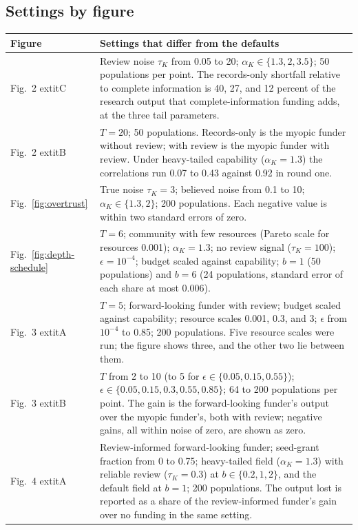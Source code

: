 \subsection*{Settings by figure}
\begin{table}[h]
\centering
\small
\begin{tabular}{@{}p{2.1cm}p{10.2cm}@{}}
\toprule
Figure & Settings that differ from the defaults \\
\midrule
Fig.~2	extit{C} & Review noise $\tau_K$ from 0.05 to 20; $\alpha_K \in \{1.3, 2, 3.5\}$; 50 populations per point. The records-only shortfall relative to complete information is 40, 27, and 12 percent of the research output that complete-information funding adds, at the three tail parameters. \\
Fig.~2	extit{B} & $T = 20$; 50 populations. Records-only is the myopic funder without review; with review is the myopic funder with review. Under heavy-tailed capability ($\alpha_K = 1.3$) the correlations run 0.07 to 0.43 against 0.92 in round one. \\
Fig.~\ref{fig:overtrust} & True noise $\tau_K = 3$; believed noise from 0.1 to 10; $\alpha_K \in \{1.3, 2\}$; 200 populations. Each negative value is within two standard errors of zero. \\
Fig.~\ref{fig:depth-schedule} & $T = 6$; community with few resources (Pareto scale for resources 0.001); $\alpha_K = 1.3$; no review signal ($\tau_K = 100$); $\epsilon = 10^{-4}$; budget scaled against capability; $b = 1$ (50 populations) and $b = 6$ (24 populations, standard error of each share at most 0.006). \\
Fig.~3	extit{A} & $T = 5$; forward-looking funder with review; budget scaled against capability; resource scales 0.001, 0.3, and 3; $\epsilon$ from $10^{-4}$ to 0.85; 200 populations. Five resource scales were run; the figure shows three, and the other two lie between them. \\
Fig.~3	extit{B} & $T$ from 2 to 10 (to 5 for $\epsilon \in \{0.05, 0.15, 0.55\}$); $\epsilon \in \{0.05, 0.15, 0.3, 0.55, 0.85\}$; 64 to 200 populations per point. The gain is the forward-looking funder's output over the myopic funder's, both with review; negative gains, all within noise of zero, are shown as zero. \\
Fig.~4	extit{A} & Review-informed forward-looking funder; seed-grant fraction from 0 to 0.75; heavy-tailed field ($\alpha_K = 1.3$) with reliable review ($\tau_K = 0.3$) at $b \in \{0.2, 1, 2\}$, and the default field at $b = 1$; 200 populations. The output lost is reported as a share of the review-informed funder's gain over no funding in the same setting. \\

\end{tabular}
\end{table}
